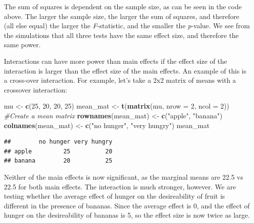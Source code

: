 \documentclass[
]{book}
\newenvironment{Shaded}{\begin{snugshade}}{\end{snugshade}}
\newcommand{\CommentTok}[1]{\textcolor[rgb]{0.56,0.35,0.01}{\textit{#1}}}
\newcommand{\DataTypeTok}[1]{\textcolor[rgb]{0.13,0.29,0.53}{#1}}
\newcommand{\DecValTok}[1]{\textcolor[rgb]{0.00,0.00,0.81}{#1}}
\newcommand{\KeywordTok}[1]{\textcolor[rgb]{0.13,0.29,0.53}{\textbf{#1}}}
\newcommand{\NormalTok}[1]{#1}
\newcommand{\StringTok}[1]{\textcolor[rgb]{0.31,0.60,0.02}{#1}}
\begin{document}
The sum of squares is dependent on the sample size, as can be seen in the code above. The larger the sample size, the larger the sum of squares, and therefore (all else equal) the larger the \emph{F}-statistic, and the smaller the \emph{p}-value. We see from the simulations that all three tests have the same effect size, and therefore the same power.

Interactions can have more power than main effects if the effect size of the interaction is larger than the effect size of the main effects. An example of this is a cross-over interaction. For example, let's take a 2x2 matrix of means with a crossover interaction:

\begin{Shaded}
\begin{Highlighting}[]
\NormalTok{mu <-}\StringTok{ }\KeywordTok{c}\NormalTok{(}\DecValTok{25}\NormalTok{, }\DecValTok{20}\NormalTok{, }\DecValTok{20}\NormalTok{, }\DecValTok{25}\NormalTok{)}
\NormalTok{mean_mat <-}\StringTok{ }\KeywordTok{t}\NormalTok{(}\KeywordTok{matrix}\NormalTok{(mu, }
                     \DataTypeTok{nrow =} \DecValTok{2}\NormalTok{,}
                     \DataTypeTok{ncol =} \DecValTok{2}\NormalTok{)) }\CommentTok{#Create a mean matrix}
\KeywordTok{rownames}\NormalTok{(mean_mat) <-}\StringTok{ }\KeywordTok{c}\NormalTok{(}\StringTok{"apple"}\NormalTok{, }\StringTok{"banana"}\NormalTok{)}
\KeywordTok{colnames}\NormalTok{(mean_mat) <-}\StringTok{ }\KeywordTok{c}\NormalTok{(}\StringTok{"no hunger"}\NormalTok{, }\StringTok{"very hungry"}\NormalTok{)}
\NormalTok{mean_mat}
\end{Highlighting}
\end{Shaded}

\begin{verbatim}
##        no hunger very hungry
## apple         25          20
## banana        20          25
\end{verbatim}

Neither of the main effects is now significant, as the marginal means are 22.5 vs 22.5 for both main effects. The interaction is much stronger, however. We are testing whether the average effect of hunger on the desireability of fruit is different in the presence of bananas. Since the average effect is 0, and the effect of hunger on the desireability of bananas is 5, so the effect size is now twice as large.
\end{document}
